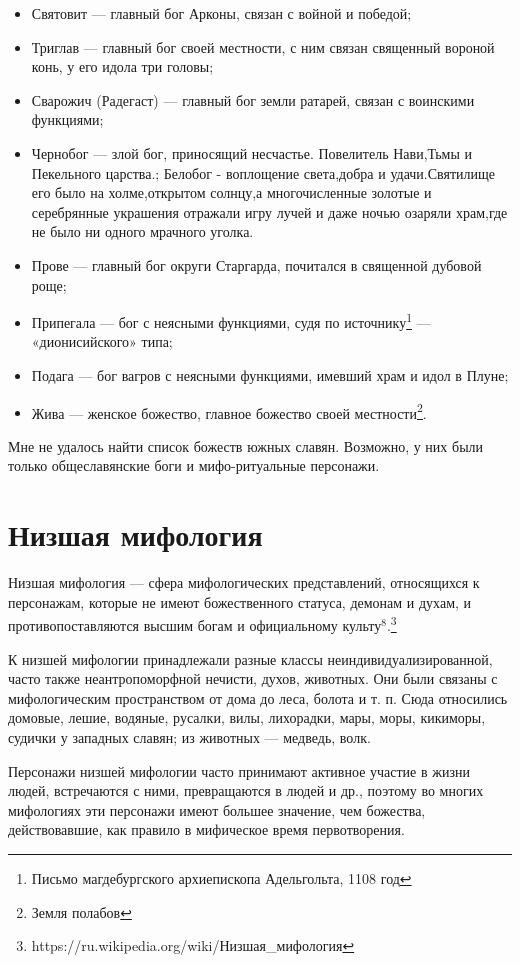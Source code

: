 \documentclass[a4paper, 12pt]{report}
\begin{document}
\begin{itemize}
  \item Святовит — главный бог Арконы, связан с войной и победой;
  \item Триглав — главный бог своей местности, с ним связан священный вороной конь, у его идола три головы;
  \item Сварожич (Радегаст) — главный бог земли ратарей, связан с воинскими функциями;
  \item Чернобог — злой бог, приносящий несчастье. Повелитель Нави,Тьмы и Пекельного царства.;
  Белобог - воплощение света,добра и удачи.Святилище его было на холме,открытом солнцу,а многочисленные золотые и серебрянные украшения отражали игру лучей и даже ночью озаряли храм,где не было ни одного мрачного уголка. 
  \item Прове — главный бог округи Старгарда, почитался в священной дубовой роще;
  \item Припегала — бог с неясными функциями, судя по источнику\footnote{Письмо магдебургского архиепископа Адельгольта, 1108 год} — «дионисийского» типа;
  \item Подага — бог вагров с неясными функциями, имевший храм и идол в Плуне;
  \item Жива — женское божество, главное божество своей местности\footnote{Земля полабов}.
\end{itemize}

Мне не удалось найти список божеств южных славян. Возможно, у них были только общеславянские боги и мифо-ритуальные персонажи.

\section{Низшая мифология}

Низшая мифология — сфера мифологических представлений, относящихся к персонажам, которые не имеют божественного статуса, демонам и духам, и противопоставляются высшим богам и официальному культу$^8$.\footnote{https://ru.wikipedia.org/wiki/Низшая\_мифология}

К низшей мифологии принадлежали разные классы неиндивидуализированной, часто также неантропоморфной нечисти, духов, животных. Они были связаны с мифологическим пространством от дома до леса, болота и т. п. Сюда относились домовые, лешие, водяные, русалки, вилы, лихорадки, мары, моры, кикиморы, судички у западных славян; из животных — медведь, волк. 

Персонажи низшей мифологии часто принимают активное участие в жизни людей, встречаются с ними, превращаются в людей и др., поэтому во многих мифологиях эти персонажи имеют большее значение, чем божества, действовавшие, как правило в мифическое время первотворения.
\end{document}
